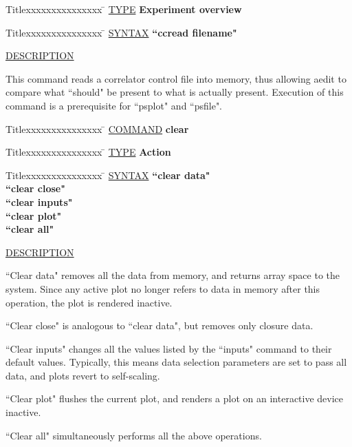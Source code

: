\begin{tabbing}
Titlexxxxxxxxxxxxxxx \= \kill
\underline{TYPE} \> {\bf 		Experiment overview} \\
\end{tabbing}

\begin{tabbing}
Titlexxxxxxxxxxxxxxx \= \kill
\underline{SYNTAX} \> {\bf 		``ccread filename"} \\
\end{tabbing}

\underline{DESCRIPTION}
\begin{list}{}{\setlength{\leftmargin}{0.5in}
     \setlength{\rightmargin}{0in}}
\item
This command reads a correlator control file into memory, thus
allowing aedit to compare what ``should" be present to what is
actually present.  Execution of this command is a prerequisite
for ``psplot" and ``psfile".
\end{list}
\vspace{.2in}

\begin{tabbing}
Titlexxxxxxxxxxxxxxx \= \kill
\underline{COMMAND} \> {\bf 	clear} \\
\end{tabbing}

\begin{tabbing}
Titlexxxxxxxxxxxxxxx \= \kill
\underline{TYPE} \> {\bf 		Action} \\
\end{tabbing}

\begin{tabbing}
Titlexxxxxxxxxxxxxxx \= \kill
\underline{SYNTAX} \> {\bf 		``clear data"} \\
\> {\bf 		``clear close"} \\
\> {\bf 		``clear inputs"} \\
\> {\bf 		``clear plot"} \\
\> {\bf 		``clear all"} \\
\end{tabbing}

\underline{DESCRIPTION}
\begin{list}{}{\setlength{\leftmargin}{0.5in}
     \setlength{\rightmargin}{0in}}
\item
``Clear data" removes all the data from memory, and returns
array space to the system.  Since any active plot no longer
refers to data in memory after this operation, the plot is
rendered inactive.
\item
``Clear close" is analogous to ``clear data", but removes only
closure data.
\item
``Clear inputs" changes all the values listed by the ``inputs"
command to their default values.  Typically, this means
data selection parameters are set to pass all data, and plots
revert to self-scaling.
\item
``Clear plot" flushes the current plot, and renders a plot on
an interactive device inactive.
\item
``Clear all" simultaneously performs all the above operations.
\end{list}
\vspace{.2in}

